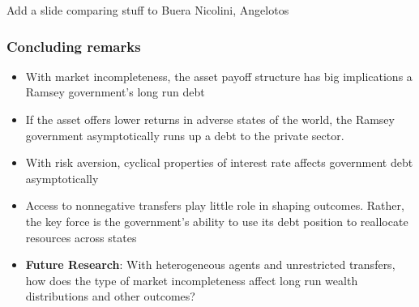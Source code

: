 \documentclass{beamer}
\begin{document}
\begin{frame}
 Add a slide comparing stuff to Buera Nicolini, Angelotos
\end{frame}

 \begin{frame}
  \frametitle{Concluding remarks }
\begin{itemize}
	\item With market incompleteness, the asset payoff structure  has big implications a Ramsey government's  long run debt
	\item If the asset offers lower returns in adverse states of the world, the Ramsey government  asymptotically runs up a  debt to the private sector.
\item With risk aversion, cyclical properties of interest rate affects government debt asymptotically
	\item  Access to nonnegative transfers play little role in shaping outcomes.  Rather, the key  force is the government's ability to use its debt position to reallocate resources across states
	\item  \textbf{Future Research}:   With heterogeneous agents and unrestricted transfers, how does the type of market incompleteness affect long run wealth distributions and other outcomes?
\end{itemize}
 \end{frame}

  
\end{document}
